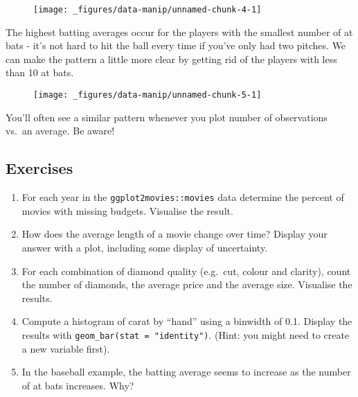 \begin{figure}[H]
  \centering
  \texttt{[image: \_figures/data-manip/unnamed-chunk-4-1]}
\end{figure}

The highest batting averages occur for the players with the smallest
number of at bats - it's not hard to hit the ball every time if you've
only had two pitches. We can make the pattern a little more clear by
getting rid of the players with less than 10 at bats.

\begin{Shaded}
\begin{Highlighting}[]
\NormalTok{(}\StringTok{ }\NormalTok{), }\StringTok{ }
\StringTok{  }\NormalTok{() +}\StringTok{ }
\StringTok{  }\NormalTok{()}


\end{Highlighting}
\end{Shaded}

\begin{figure}[H]
  \centering
  \texttt{[image: \_figures/data-manip/unnamed-chunk-5-1]}
\end{figure}

You'll often see a similar pattern whenever you plot number of
observations vs.~an average. Be aware!

\subsection{Exercises}\label{exercises-2}

\begin{enumerate}
\def\labelenumi{\arabic{enumi}.}
\item
  For each year in the \texttt{ggplot2movies::movies} data determine the
  percent of movies with missing budgets. Visualise the result.
\item
  How does the average length of a movie change over time? Display your
  answer with a plot, including some display of uncertainty.
\item
  For each combination of diamond quality (e.g.~cut, colour and
  clarity), count the number of diamonds, the average price and the
  average size. Visualise the results.
\item
  Compute a histogram of carat by ``hand'' using a binwidth of 0.1.
  Display the results with \texttt{geom\_bar(stat\ =\ "identity")}.
  (Hint: you might need to create a new variable first).
\item
  In the baseball example, the batting average seems to increase as the
  number of at bats increases. Why?
\end{enumerate}

